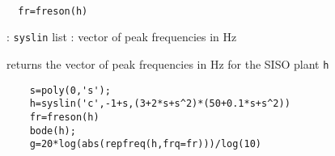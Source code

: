 \begin{mandesc}
   \\ %
\end{mandesc}
\begin{calling_sequence}
\begin{verbatim}
  fr=freson(h)  
\end{verbatim}
\end{calling_sequence}
\begin{parameters}
  \begin{varlist}
    : \verb!syslin! list
    : vector of peak frequencies in Hz
  \end{varlist}
\end{parameters}
\begin{mandescription}
  returns the vector of peak frequencies in Hz for the SISO plant
  \verb!h!
\end{mandescription}
\begin{examples}
  \begin{Verbatim}
    s=poly(0,'s');
    h=syslin('c',-1+s,(3+2*s+s^2)*(50+0.1*s+s^2))
    fr=freson(h)
    bode(h);
    g=20*log(abs(repfreq(h,frq=fr)))/log(10)
  \end{Verbatim}
\end{examples}
\begin{manseealso}
      
\end{manseealso}
